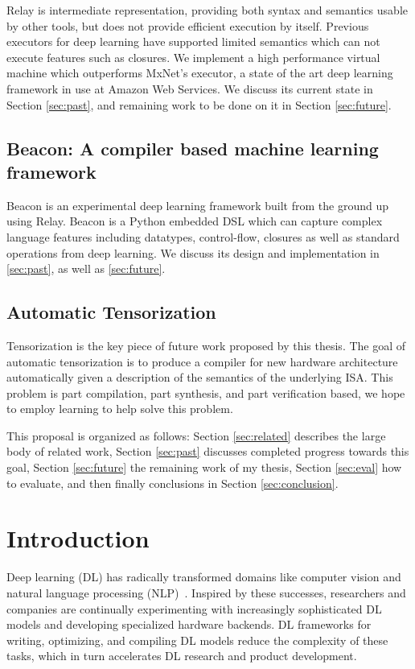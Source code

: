 Relay is intermediate representation, providing both
  syntax and semantics usable by other tools, but
  does not provide efficient execution by itself.
Previous executors for deep learning have supported
  limited semantics which can not execute features such as closures.
We implement a high performance virtual machine which
  outperforms MxNet's executor, a state of the art deep
  learning framework in use at Amazon Web Services.
We discuss its current state in Section \ref{sec:past},
  and remaining work to be done on it in Section \ref{sec:future}.

\subsection{Beacon: A compiler based machine learning framework}

Beacon is an experimental deep learning framework built from the ground up
  using Relay.
Beacon is a Python embedded DSL which can capture
  complex language features including datatypes, control-flow, closures
  as well as standard operations from deep learning.
We discuss its design and implementation in \ref{sec:past}, as well as \ref{sec:future}.

\subsection{Automatic Tensorization}

Tensorization is the key piece of future work proposed by this thesis.
The goal of automatic tensorization is to produce a compiler for new
hardware architecture automatically given a description of the semantics
of the underlying ISA.
This problem is part compilation, part synthesis, and part verification based,
  we hope to employ learning to help solve this problem.

This proposal is organized as follows:
  Section \ref{sec:related} describes the large body of related work,
  Section \ref{sec:past} discusses completed progress towards this goal,
  Section \ref{sec:future} the remaining work of my thesis,
  Section \ref{sec:eval} how to evaluate,
  and then finally conclusions in Section \ref{sec:conclusion}.

  \section{Introduction}
\label{sec:intro}

Deep learning (DL) has radically transformed domains like
  computer vision and
  natural language processing (NLP)~\citep{yolo, recent_trends_in_nlp}.
Inspired by these successes,
  researchers and companies are continually
  experimenting with increasingly sophisticated DL models and
  developing specialized hardware backends.
DL frameworks for writing, optimizing, and compiling DL models
  reduce the complexity of these tasks,
  which in turn accelerates DL research and product development.

